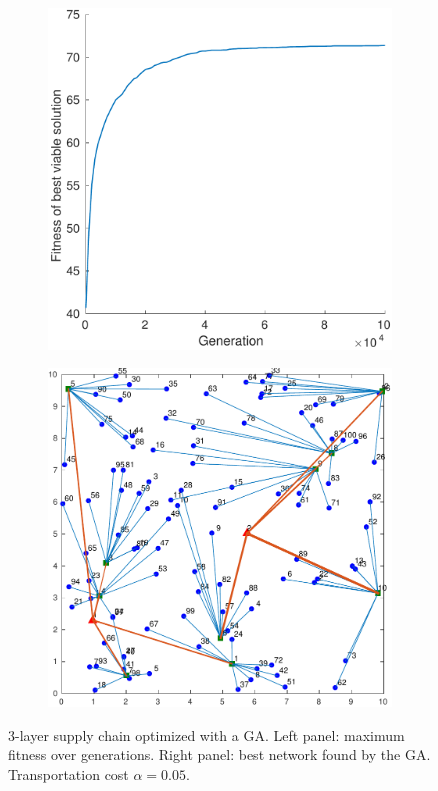 \documentclass[12pt,titlepage]{article}
\begin{document}
\begin{figure}[hbtp]
    \centering
    \begin{subfigure}[b]{0.475\textwidth}
        \includegraphics[width=\textwidth]{fitness_3l_005.pdf}
    \end{subfigure}%
    \hfill%
    \begin{subfigure}[b]{0.475\textwidth}
        \includegraphics[width=\textwidth]{network_3l_005.pdf}
    \end{subfigure}
    \caption{3-layer supply chain optimized with a GA. Left panel: maximum fitness over generations. Right panel: best network found by the GA. Transportation cost $\alpha = 0.05$.}\label{fig:GA_3l_0.05}
\end{figure}



 

\end{document}
